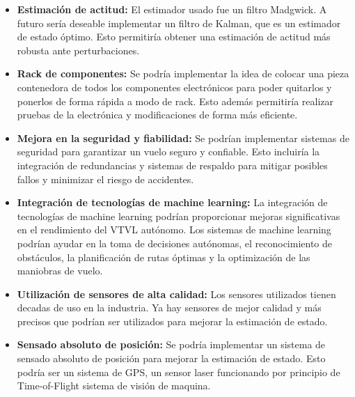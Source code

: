 \begin{itemize}
    \item \textbf{Estimación de actitud:} El estimador usado fue un filtro Madgwick. A futuro sería deseable implementar un filtro de Kalman, que es un estimador de estado óptimo. Esto permitiría obtener una estimación de actitud más robusta ante perturbaciones.
    \item \textbf{Rack de componentes:} Se podría implementar la idea de colocar una pieza contenedora de todos los componentes electrónicos para poder quitarlos y ponerlos de forma rápida a modo de rack. Esto además permitiría realizar pruebas de la electrónica y modificaciones de forma más eficiente.
    \item \textbf{Mejora en la seguridad y fiabilidad:} Se podrían implementar sistemas de seguridad para garantizar un vuelo seguro y confiable. Esto incluiría la integración de redundancias y sistemas de respaldo para mitigar posibles fallos y minimizar el riesgo de accidentes.
    \item \textbf{Integración de tecnologías de machine learning:} La integración de tecnologías de machine learning podrían proporcionar mejoras significativas en el rendimiento del VTVL autónomo. Los sistemas de machine learning podrían ayudar en la toma de decisiones autónomas, el reconocimiento de obstáculos, la planificación de rutas óptimas y la optimización de las maniobras de vuelo.
    \item \textbf{Utilización de sensores de alta calidad:} Los sensores utilizados tienen decadas de uso en la industria. Ya hay sensores de mejor calidad y más precisos que podrían ser utilizados para mejorar la estimación de estado.
    \item \textbf{Sensado absoluto de posición: } Se podría implementar un sistema de sensado absoluto de posición para mejorar la estimación de estado. Esto podría ser un sistema de GPS, un sensor laser funcionando por principio de Time-of-Flight sistema de visión de maquina.
\end{itemize}